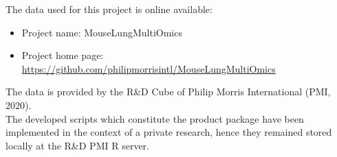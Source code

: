 The data used for this project is online available:
\begin{itemize}
    \item Project name: MouseLungMultiOmics
    \item Project home page: \url{https://github.com/philipmorrisintl/MouseLungMultiOmics}
\end{itemize}

The data is provided by the R\&D Cube of Philip Morris International (PMI, 2020).
\\

The developed scripts which constitute the product package have been  implemented in the context of a private research, hence they remained stored locally at the R&D PMI R server.
\\